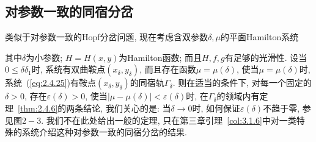 \subsection{对参数一致的同宿分岔}
类似于对参数一致的Hopf分岔问题,
现在考虑含双参数$\delta,\mu$的平面Hamilton系统
\begin{ode}
  \label{eq:2.4.25}
  \dxdt=-+\delta f(x, y, \mu, \delta)} ,\\
\dydt=\frac{\partial H}{\partial x}+\delta g(x, y, \mu, \delta)},
\end{ode}

其中$\delta$为小参数;
$H=H(x,y)$为Hamilton函数;
而且$H,f,g$有足够的光滑性.
设当$0\leq \delta \delta_1$时,
系统有双曲鞍点$(x_{\delta},y_{\delta})$,
而且存在函数$\mu=\mu(\delta)$,
使当$\mu=\mu(\delta)$时,
系统~(\ref{eq:2.4.25})有鞍点$(x_{\delta},y_{\delta})$的同宿轨$\Gamma_{\delta}$.
则在适当的条件下,
对每一个固定的$\delta>0$,
存在$\varepsilon(\delta)>0$,
使当$|\mu-\mu(\delta)|<\varepsilon(\delta)$时,
在$\Gamma_{\delta}$的领域内有定理~\ref{thm:2.4.6}的两条结论,
我们关心的是:
当$\delta \to 0$时,
如何保证$\varepsilon(\delta)$不趋于零,
参见图$2-3$.
我们不在此处给出一般的定理,
只在第三章引理~\ref{col:3.1.6}中对一类特殊的系统介绍这种对参数一致的同宿分岔的结果.